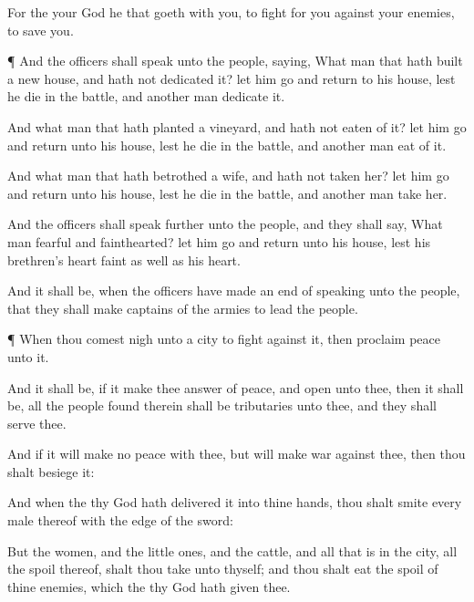 {For the
{} your
God
{} he that
goeth with you, to
fight for you against your
enemies, to
save you.


\par }{\PP {}¶ And the
officers shall
speak unto the
people,
saying, What
man
{} that hath
built a
new
house, and hath not
dedicated it? let him
go and
return to his
house, lest he
die in the
battle, and
another
man
dedicate it.

And what
man
{} that hath
planted a
vineyard, and hath not
{}
eaten of it? let him
{}
go and
return unto his
house, lest he
die in the
battle, and
another
man
eat of it.

And what
man
{} that hath
betrothed a
wife, and hath not
taken her? let him
go and
return unto his
house, lest he
die in the
battle, and
another
man
take her.

And the
officers shall
speak
further unto the
people, and they shall
say, What
man
{}
fearful and
fainthearted? let him
go and
return unto his
house, lest his
brethren’s
heart
faint as well as his
heart.

And it shall be, when the
officers have made an
end of
speaking unto the
people, that they shall
make
captains of the
armies to
lead the
people.


\par }{\PP {}¶ When thou comest
nigh unto a
city to
fight against it, then
proclaim
peace unto it.

And it shall be, if it make thee
answer of
peace, and
open unto thee, then it shall be,
{} all the
people
{}
found therein shall be
tributaries unto thee, and they shall
serve thee.

And if it will make no
peace with thee, but will
make
war against thee, then thou shalt
besiege it:

And when the
{} thy
God hath
delivered it into thine
hands, thou shalt
smite every
male thereof with the
edge of the
sword:

But the
women, and the little
ones, and the
cattle, and all that is in the
city,
{} all the
spoil thereof, shalt thou
take unto thyself; and thou shalt
eat the
spoil of thine
enemies, which the
{} thy
God hath
given thee.

}
